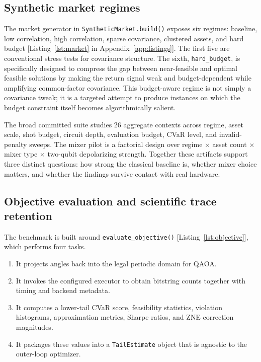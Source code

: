 \documentclass[11pt]{article}
\begin{document}
\subsection{Synthetic market regimes}

The market generator in \texttt{SyntheticMarket.build()} exposes six regimes: baseline, low correlation, high correlation, sparse covariance, clustered assets, and hard budget [Listing~\ref{lst:market} in Appendix~\ref{app:listings}]. The first five are conventional stress tests for covariance structure. The sixth, \texttt{hard\_budget}, is specifically designed to compress the gap between near-feasible and optimal feasible solutions by making the return signal weak and budget-dependent while amplifying common-factor covariance. This budget-aware regime is not simply a covariance tweak; it is a targeted attempt to produce instances on which the budget constraint itself becomes algorithmically salient.

The broad committed suite studies 26 aggregate contexts across regime, asset scale, shot budget, circuit depth, evaluation budget, CVaR level, and invalid-penalty sweeps. The mixer pilot is a factorial design over regime \(\times\) asset count \(\times\) mixer type \(\times\) two-qubit depolarizing strength. Together these artifacts support three distinct questions: how strong the classical baseline is, whether mixer choice matters, and whether the findings survive contact with real hardware.

\subsection{Objective evaluation and scientific trace retention}

The benchmark is built around \texttt{evaluate\_objective()} [Listing~\ref{lst:objective}], which performs four tasks.
\begin{enumerate}[leftmargin=1.5em]
\item It projects angles back into the legal periodic domain for QAOA.
\item It invokes the configured executor to obtain bitstring counts together with timing and backend metadata.
\item It computes a lower-tail CVaR score, feasibility statistics, violation histograms, approximation metrics, Sharpe ratios, and ZNE correction magnitudes.
\item It packages these values into a \texttt{TailEstimate} object that is agnostic to the outer-loop optimizer.
\end{enumerate}
\end{document}
